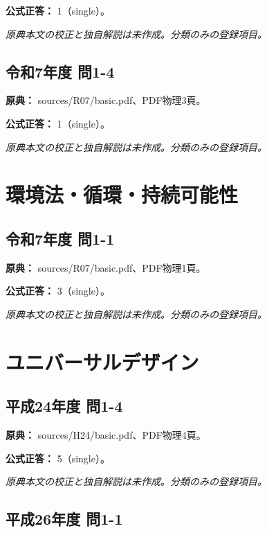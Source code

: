 \textbf{公式正答：} 1（single）。

\par\textit{原典本文の校正と独自解説は未作成。分類のみの登録項目。}

\subsection{令和7年度 問1-4}
\label{q:r07-reg-basic-1-4}

\noindent\textbf{原典：} sources/R07/basic.pdf、PDF物理3頁。

\textbf{公式正答：} 1（single）。

\par\textit{原典本文の校正と独自解説は未作成。分類のみの登録項目。}

\section{環境法・循環・持続可能性}

\subsection{令和7年度 問1-1}
\label{q:r07-reg-basic-1-1}

\noindent\textbf{原典：} sources/R07/basic.pdf、PDF物理1頁。

\textbf{公式正答：} 3（single）。

\par\textit{原典本文の校正と独自解説は未作成。分類のみの登録項目。}

\section{ユニバーサルデザイン}

\subsection{平成24年度 問1-4}
\label{q:h24-reg-basic-1-4}

\noindent\textbf{原典：} sources/H24/basic.pdf、PDF物理4頁。

\textbf{公式正答：} 5（single）。

\par\textit{原典本文の校正と独自解説は未作成。分類のみの登録項目。}

\subsection{平成26年度 問1-1}
\label{q:h26-reg-basic-1-1}

